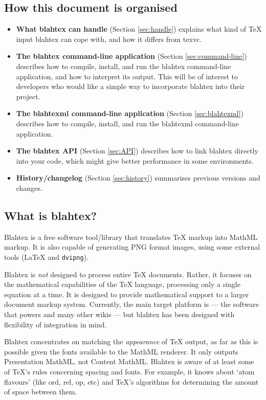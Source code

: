 \documentclass{article}
\begin{document}
\subsection{How this document is organised}

\begin{itemize}
\item {\bf What blahtex can handle} (Section \ref{sec:handle}) explains what kind of \TeX{} input blahtex can cope with, and how it differs from texvc.
\item {\bf The blahtex command-line application} (Section \ref{sec:command-line}) describes how to compile, install, and run the blahtex command-line application, and how to interpret its output. This will be of interest to developers who would like a simple way to incorporate blahtex into their project.
\item {\bf The blahtexml command-line application} (Section \ref{sec:blahtexml}) describes how to compile, install, and run the blahtexml command-line application.
\item {\bf The blahtex API} (Section \ref{sec:API}) describes how to link blahtex directly into your code, which might give better performance in some environments.
\item {\bf History/changelog} (Section \ref{sec:history}) summarises previous versions and changes.
\end{itemize}

\subsection{What is blahtex?}

Blahtex is a free software tool/library that translates \TeX{} markup into MathML markup. It is also capable of generating PNG format images, using some external tools (\LaTeX{} and \texttt{dvipng}).

Blahtex is \emph{not} designed to process entire \TeX{} documents. Rather, it focuses on the mathematical capabilities of the \TeX{} language, processing only a single equation at a time. It is designed to provide mathematical support to a larger document markup system. Currently, the main target platform is  --- the software that powers  and many other wikis --- but blahtex has been designed with flexibility of integration in mind.

Blahtex concentrates on matching the \emph{appearance} of \TeX{} output, as far as this is possible given the fonts available to the MathML renderer. It only outputs Presentation MathML, not Content MathML. Blahtex is aware of at least some of \TeX{}'s rules concerning spacing and fonts. For example, it knows about `atom flavours' (like ord, rel, op, etc) and \TeX{}'s algorithms for determining the amount of space between them.
\end{document}
